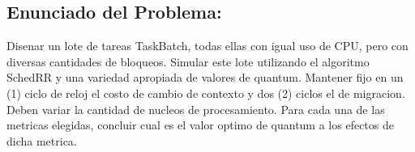 \subsection{Enunciado del Problema:}

Disenar un lote de tareas TaskBatch, todas ellas con igual uso de CPU, pero con diversas cantidades de bloqueos. Simular este lote utilizando el algoritmo SchedRR y una variedad apropiada de valores de quantum. Mantener fijo en un (1) ciclo de reloj el costo de cambio de contexto y dos (2) ciclos el de migracion. Deben variar la cantidad de nucleos de procesamiento. Para cada una de las metricas elegidas, concluir cual es el valor optimo de quantum a los efectos de dicha metrica.